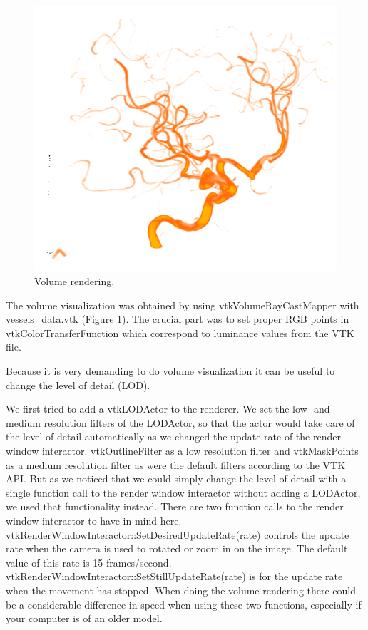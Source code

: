 \begin{figure}
	\centering
	\includegraphics[scale=0.4]{fig/volume-rendering}
	\caption{Volume rendering.}\label{fig:volume-rendering}
\end{figure}

The volume visualization was obtained by using vtkVolumeRayCastMapper with vessels\_data.vtk (Figure \ref{fig:volume-rendering}). The crucial part was to set proper RGB points in vtkColorTransferFunction which correspond to luminance values from the VTK file.

Because it is very demanding to do volume visualization it can be useful to change the level of detail (LOD).

We first tried to add a vtkLODActor to the renderer. We set the low- and medium resolution filters of the LODActor, so that the actor would take care of the level of detail automatically as we changed the update rate of the render window interactor. vtkOutlineFilter as a low resolution filter and vtkMaskPoints as a medium resolution filter as were the default filters according to the VTK API. But as we noticed that we could simply change the level of detail with a single function call to the render window interactor without adding a LODActor, we used that functionality instead. There are two function calls to the render window interactor to have in mind here. vtkRenderWindowInteractor::SetDesiredUpdateRate(rate) controls the update rate when the camera is used to rotated or zoom in on the image. The default value of this rate is 15 frames/second. vtkRenderWindowInteractor::SetStillUpdateRate(rate) is for the update rate when the movement has stopped. When doing the volume rendering there could be a considerable difference in speed when using these two functions, especially if your computer is of an older model.


